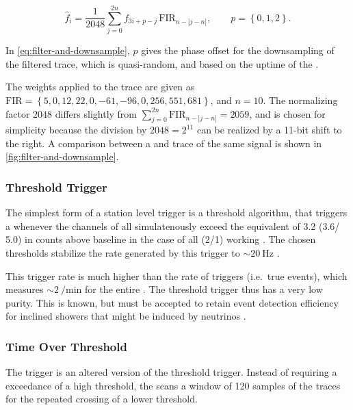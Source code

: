 \begin{equation}
\label{eq:filter-and-downsample} 
\hat{f}_i = \frac{1}{2048} \sum^{2 n}_{j = 0} f_{3i+p-j} \, \mathrm{FIR}_{n - \left| j-n \right|}, \qquad p = \left\{ 0, 1, 2 \right\}.
\end{equation}

In \cref{eq:filter-and-downsample}, $p$ gives the phase offset for the 
downsampling of the filtered trace, which is quasi-random, and based on the 
uptime of the \FPGA.

The \FIR weights applied to the \FBW trace are given as
$\mathrm{FIR} = \left\{ 5, 0, 12, 22, 0, -61, -96, 0, 256, 551, 681 \right\}$, 
and $n=10$. The normalizing factor $2048$ differs slightly from 
$\sum^{2n}_{j=0} \mathrm{FIR}_{n-\left| j-n \right|} = 2059$, and is chosen for
simplicity because the division by $2048 = 2^{11}$ can be realized by a 11-bit 
shift to the right. A comparison between a \FBW and \FDS trace of the same 
signal is shown in \cref{fig:filter-and-downsample}.

\subsubsection{Threshold Trigger}
\label{sssec:threshold-t2}

The simplest form of a station level trigger is a \SB threshold algorithm, that
triggers a \TTWO whenever the \HG channels of all \WCD \LPMTs simulatenously 
exceed the equivalent of \SI{3.2}{\VemOnline} (\SI{3.6}{\VemOnline}/
\SI{5.0}{\VemOnline}) in \ADC counts above baseline in the case of all (2/1) 
working \LPMTs. The chosen thresholds stabilize the \TTWO rate generated by 
this \SB trigger to $\sim\SI{20}{\hertz}$ 
\cite{abrahamTriggerApertureSurface2010}.

This trigger rate is much higher than the rate of \TTHREE triggers (i.e.\ true
\EAS events), which measures $\sim\SI{2}{\per\minute}$ for the entire \SD 
\cite{ramellaT3RateCompatibility2025}. The threshold trigger thus has a very 
low purity. This is known, but must be accepted to retain event detection 
efficiency for inclined showers that might be induced by neutrinos 
\cite{anchordoquiExoticNeutrinoInteractions2006}.

\subsubsection{Time Over Threshold}

The \ToT trigger is an altered version of the threshold trigger. Instead of 
requiring a \SB exceedance of a high threshold, the \ToT scans a window of 120
samples of the \FDS traces for the repeated crossing of a lower threshold.

